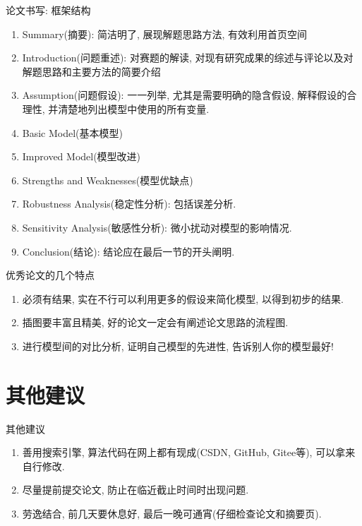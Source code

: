\documentclass{ctexbeamer}
\begin{document}
\begin{frame}{论文书写: 框架结构}
	\begin{enumerate}
		\item Summary(摘要): 简洁明了, 展现解题思路方法, 有效利用首页空间
		\item Introduction(问题重述): 对赛题的解读, 对现有研究成果的综述与评论以及对解题思路和主要方法的简要介绍
		\item Assumption(问题假设): 一一列举, 尤其是需要明确的隐含假设, 解释假设的合理性, 并清楚地列出模型中使用的所有变量.
		\item Basic Model(基本模型)
		\item Improved Model(模型改进)
		\item Strengths and Weaknesses(模型优缺点)
		\item Robustness Analysis(稳定性分析): 包括误差分析.
		\item Sensitivity Analysis(敏感性分析): 微小扰动对模型的影响情况.
		\item Conclusion(结论): 结论应在最后一节的开头阐明.
	\end{enumerate}

\end{frame}

\begin{frame}{优秀论文的几个特点}

	\begin{enumerate}
		\item 必须有结果, 实在不行可以利用更多的假设来简化模型, 以得到初步的结果.
		\item 插图要丰富且精美, 好的论文一定会有阐述论文思路的流程图.
		\item 进行模型间的对比分析, 证明自己模型的先进性, 告诉别人你的模型最好!
	\end{enumerate}
\end{frame}



\section{其他建议} %
\label{sec:其他建议}
\begin{frame}{其他建议}
	\begin{enumerate}
		\item \alert{善用搜索引擎}, 算法代码在网上都有现成(CSDN, GitHub, Gitee等), 可以拿来自行修改.
		\item 尽量提前提交论文, 防止在临近截止时间时出现问题.
		\item 劳逸结合, 前几天要休息好, 最后一晚可通宵(仔细检查论文和摘要页).

	\end{enumerate}
\end{frame}


\begin{frame}{}
	\begin{center}
	\end{center}
\end{frame}
\end{document}
